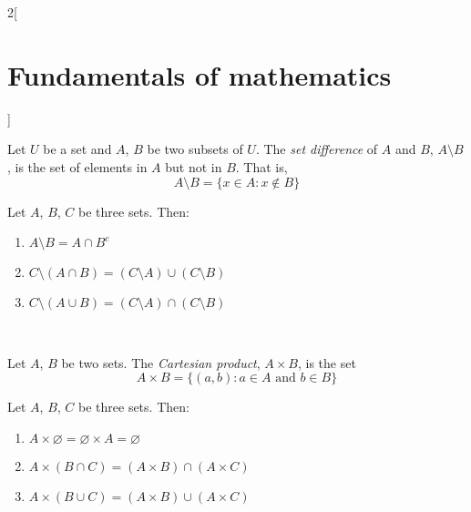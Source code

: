 \documentclass[../../../main.tex]{subfiles}
\begin{document}
\begin{multicols}{2}[\section{Fundamentals of mathematics}]
\begin{definition}
    Let $U$ be a set and $A$, $B$ be two subsets of $U$. The \emph{set difference} of $A$ and $B$, $A\setminus B$, is the set of elements in $A$ but not in $B$. That is, $$A\setminus B=\{x\in A:x\notin B\}$$
  \end{definition}
  \begin{proposition}
    Let $A$, $B$, $C$ be three sets. Then:
    \begin{enumerate}
      \item $A\setminus B=A\cap B^c$
      \item $C\setminus(A\cap B)=(C\setminus A)\cup (C\setminus B)$
      \item $C\setminus(A\cup B)=(C\setminus A)\cap (C\setminus B)$
    \end{enumerate}
  \end{proposition}
  \begin{center}
    \hfill
    \\
    \vspace{0.02\linewidth}
    \hfill
    
  \end{center}
  \begin{definition}
    Let $A$, $B$ be two sets. The \emph{Cartesian product}, $A\times B$, is the set $$A\times B=\{(a,b): a\in A\text{ and }b\in B\}$$
  \end{definition}
  \begin{proposition}
    Let $A$, $B$, $C$ be three sets. Then:
    \begin{enumerate}
      \item $A\times \varnothing=\varnothing\times A=\varnothing$
      \item $A\times(B\cap C)=(A\times B)\cap(A\times C)$
      \item $A\times(B\cup C)=(A\times B)\cup(A\times C)$
    \end{enumerate}
  \end{proposition}

\end{multicols}
\end{document}
